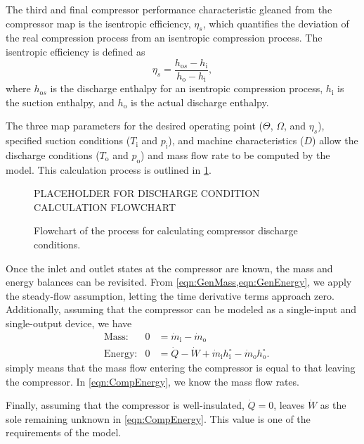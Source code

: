 The third and final compressor performance characteristic gleaned 
from the compressor map is the isentropic efficiency, $\eta_s$, 
which quantifies the deviation of the real compression process 
from an isentropic compression process. 
The isentropic efficiency is defined as
\begin{equation}
  \eta_s = \frac{h_{\text{o}s}-h_{\text{i}}}{h_{\text{o}}-h_{\text{i}}},
\end{equation}
where $h_{\text{o}s}$ is the discharge enthalpy for an isentropic compression process, 
$h_{\text{i}}$ is the suction enthalpy, 
and $h_{\text{o}}$ is the actual discharge enthalpy. 

The three map parameters for the desired operating point 
($\Theta$, $\Omega$, and $\eta_s$), 
specified suction conditions ($T_{\text{i}}$ and $p_{\text{i}}$), 
and machine characteristics ($D$) 
allow the discharge conditions ($T_{\text{o}}$ and $p_{\text{o}}$) 
and mass flow rate to be computed by the model. 
This calculation process is outlined in \cref{fig:DischargeCalc}.
\begin{figure}[htbp]
  \centering
  PLACEHOLDER FOR DISCHARGE CONDITION CALCULATION FLOWCHART
  \caption{Flowchart of the process for calculating compressor discharge conditions.}
  \label{fig:DischargeCalc}
\end{figure}

Once the inlet and outlet states at the compressor are known, 
the mass and energy balances can be revisited. 
From \cref{eqn:GenMass,eqn:GenEnergy}, we apply the steady-flow assumption, 
letting the time derivative terms approach zero. 
Additionally, assuming that the compressor can be modeled as a 
single-input and single-output device, we have
\begin{align}
  &\text{Mass:}   & 0 &= {\dot{m}_{\text{i}}} - {\dot{m}_{\text{o}}} \label{eqn:CompMass}\\
  &\text{Energy:} & 0 &= \dot{Q} - \dot{W} + {\dot{m}_{\text{i}}h^{\circ}_{\text{i}}} - 
		{\dot{m}_{\text{o}}h^{\circ}_{\text{o}}} \label{eqn:CompEnergy}.
\end{align}
 simply means that the mass flow 
entering the compressor is equal to that leaving the compressor. 
In \cref{eqn:CompEnergy}, we know the mass flow rates. 

Finally, assuming that the compressor is well-insulated, 
\ie{} $\dot{Q}=0$, leaves $\dot{W}$ 
as the sole remaining unknown in \cref{eqn:CompEnergy}. 
This value is one of the requirements of the model. 

